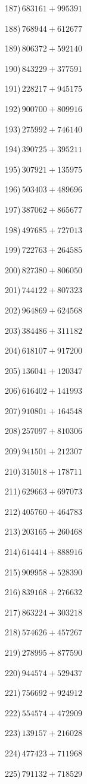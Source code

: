 \documentclass{article}
\begin{document}
\begin{multicols}{2}
187)$\,683161+995391$ \par 
188)$\,768944+612677$ \par 
189)$\,806372+592140$ \par 
190)$\,843229+377591$ \par 
191)$\,228217+945175$ \par 
192)$\,900700+809916$ \par 
193)$\,275992+746140$ \par 
194)$\,390725+395211$ \par 
195)$\,307921+135975$ \par 
196)$\,503403+489696$ \par 
197)$\,387062+865677$ \par 
198)$\,497685+727013$ \par 
199)$\,722763+264585$ \par 
200)$\,827380+806050$ \par 
201)$\,744122+807323$ \par 
202)$\,964869+624568$ \par 
203)$\,384486+311182$ \par 
204)$\,618107+917200$ \par 
205)$\,136041+120347$ \par 
206)$\,616402+141993$ \par 
207)$\,910801+164548$ \par 
208)$\,257097+810306$ \par 
209)$\,941501+212307$ \par 
210)$\,315018+178711$ \par 
211)$\,629663+697073$ \par 
212)$\,405760+464783$ \par 
213)$\,203165+260468$ \par 
214)$\,614414+888916$ \par 
215)$\,909958+528390$ \par 
216)$\,839168+276632$ \par 
217)$\,863224+303218$ \par 
218)$\,574626+457267$ \par 
219)$\,278995+877590$ \par 
220)$\,944574+529437$ \par 
221)$\,756692+924912$ \par 
222)$\,554574+472909$ \par 
223)$\,139157+216028$ \par 
224)$\,477423+711968$ \par 
225)$\,791132+718529$ \par 

\end{multicols}
\end{document}
